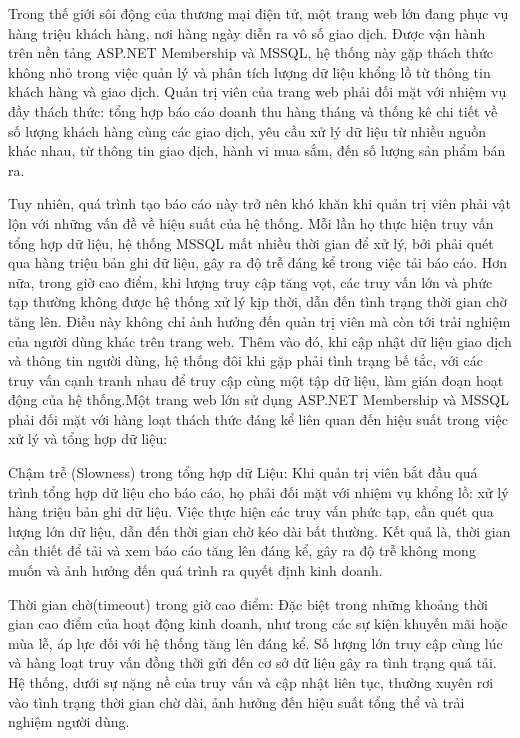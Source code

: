 \documentclass{article}[14pt]
\begin{document}
{{Trong thế giới sôi động của thương mại điện tử, một trang web lớn đang phục vụ hàng triệu khách hàng, nơi hàng ngày diễn ra vô số giao dịch. Được vận hành trên nền tảng ASP.NET Membership và MSSQL, hệ thống này gặp thách thức không nhỏ trong việc quản lý và phân tích lượng dữ liệu khổng lồ từ thông tin khách hàng và giao dịch. Quản trị viên của trang web phải đối mặt với nhiệm vụ đầy thách thức: tổng hợp báo cáo doanh thu hàng tháng và thống kê chi tiết về số lượng khách hàng cùng các giao dịch, yêu cầu xử lý dữ liệu từ nhiều nguồn khác nhau, từ thông tin giao dịch, hành vi mua sắm, đến số lượng sản phẩm bán ra.

Tuy nhiên, quá trình tạo báo cáo này trở nên khó khăn khi quản trị viên phải vật lộn với những vấn đề về hiệu suất của hệ thống. Mỗi lần họ thực hiện truy vấn tổng hợp dữ liệu, hệ thống MSSQL mất nhiều thời gian để xử lý, bởi phải quét qua hàng triệu bản ghi dữ liệu, gây ra độ trễ đáng kể trong việc tải báo cáo. Hơn nữa, trong giờ cao điểm, khi lượng truy cập tăng vọt, các truy vấn lớn và phức tạp thường không được hệ thống xử lý kịp thời, dẫn đến tình trạng thời gian chờ tăng lên. Điều này không chỉ ảnh hưởng đến quản trị viên mà còn tới trải nghiệm của người dùng khác trên trang web. Thêm vào đó, khi cập nhật dữ liệu giao dịch và thông tin người dùng, hệ thống đôi khi gặp phải tình trạng bế tắc, với các truy vấn cạnh tranh nhau để truy cập cùng một tập dữ liệu, làm gián đoạn hoạt động của hệ thống.Một trang web lớn sử dụng ASP.NET Membership và MSSQL phải đối mặt với hàng loạt thách thức đáng kể liên quan đến hiệu suất trong việc xử lý và tổng hợp dữ liệu:

Chậm trễ (Slowness) trong tổng hợp dữ Liệu:
Khi quản trị viên bắt đầu quá trình tổng hợp dữ liệu cho báo cáo, họ phải đối mặt với nhiệm vụ khổng lồ: xử lý hàng triệu bản ghi dữ liệu. Việc thực hiện các truy vấn phức tạp, cần quét qua lượng lớn dữ liệu, dẫn đến thời gian chờ kéo dài bất thường. Kết quả là, thời gian cần thiết để tải và xem báo cáo tăng lên đáng kể, gây ra độ trễ không mong muốn và ảnh hưởng đến quá trình ra quyết định kinh doanh.

Thời gian chờ(timeout) trong giờ cao điểm:
Đặc biệt trong những khoảng thời gian cao điểm của hoạt động kinh doanh, như trong các sự kiện khuyến mãi hoặc mùa lễ, áp lực đối với hệ thống tăng lên đáng kể. Số lượng lớn truy cập cùng lúc và hàng loạt truy vấn đồng thời gửi đến cơ sở dữ liệu gây ra tình trạng quá tải. Hệ thống, dưới sự nặng nề của truy vấn và cập nhật liên tục, thường xuyên rơi vào tình trạng thời gian chờ dài, ảnh hưởng đến hiệu suất tổng thể và trải nghiệm người dùng.

}}
\end{document}
